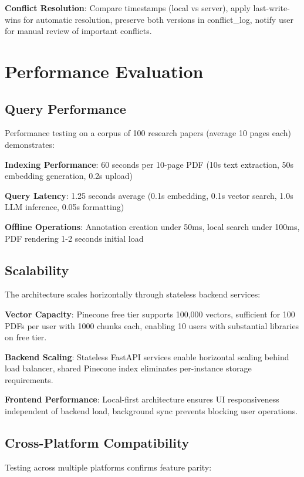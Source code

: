 \documentclass[conference]{IEEEtran}
\begin{document}
\textbf{Conflict Resolution}: Compare timestamps (local vs server), apply last-write-wins for automatic resolution, preserve both versions in conflict\_log, notify user for manual review of important conflicts.

\section{Performance Evaluation}

\subsection{Query Performance}

Performance testing on a corpus of 100 research papers (average 10 pages each) demonstrates:

\textbf{Indexing Performance}: 60 seconds per 10-page PDF (10s text extraction, 50s embedding generation, 0.2s upload)

\textbf{Query Latency}: 1.25 seconds average (0.1s embedding, 0.1s vector search, 1.0s LLM inference, 0.05s formatting)

\textbf{Offline Operations}: Annotation creation under 50ms, local search under 100ms, PDF rendering 1-2 seconds initial load

\subsection{Scalability}

The architecture scales horizontally through stateless backend services:

\textbf{Vector Capacity}: Pinecone free tier supports 100,000 vectors, sufficient for 100 PDFs per user with 1000 chunks each, enabling 10 users with substantial libraries on free tier.

\textbf{Backend Scaling}: Stateless FastAPI services enable horizontal scaling behind load balancer, shared Pinecone index eliminates per-instance storage requirements.

\textbf{Frontend Performance}: Local-first architecture ensures UI responsiveness independent of backend load, background sync prevents blocking user operations.

\subsection{Cross-Platform Compatibility}

Testing across multiple platforms confirms feature parity:
\end{document}
